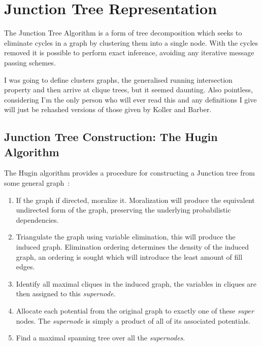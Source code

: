 

\section{Junction Tree Representation}
\label{section:cluster_graph}
The Junction Tree Algorithm is a form of tree decomposition which seeks to eliminate cycles in a graph by clustering them into a single node. With the cycles removed  it is possible to perform exact inference, avoiding any iterative message passing schemes.

\begin{remark}
I was going to define clusters graphs, the generalised running intersection property and then arrive at clique trees, but it seemed daunting. Also pointless, considering I'm the only person who will ever read this and any definitions I give will just be rehashed versions of those given by Koller and Barber.
\end{remark}


\subsection{Junction Tree Construction: The Hugin Algorithm}
\label{subsection:jtree_construction}
The Hugin algorithm provides a procedure for constructing a Junction tree from some general graph~\cite{Du_Preez_week5}:

\begin{enumerate}
\item If the graph if directed, moralize it. Moralization will produce the equivalent undirected form of the graph, preserving the underlying probabilistic dependencies.
\item Triangulate the graph using variable elimination, this will produce the induced graph. Elimination ordering determines the density of the induced graph, an ordering is sought which will introduce the least amount of fill edges.
\item Identify all maximal cliques in the induced graph, the variables in cliques are then assigned to this \textit{supernode}.
\item Allocate each potential from the original graph to exactly one of these \textit{super} nodes. The \textit{supernode} is simply a product of all of its associated potentials.
\item Find a maximal spanning tree over all the \textit{supernodes}.
\end{enumerate}

